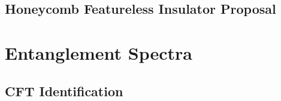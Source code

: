 \documentclass[t]{beamer}
\begin{document}
\subsection{Honeycomb Featureless Insulator Proposal}


\section{Entanglement Spectra}
\subsection{CFT Identification}








\section*{}


\end{document}
